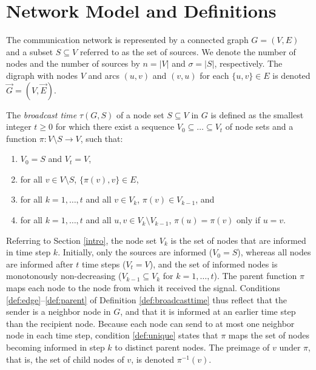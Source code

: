 \section{Network Model and Definitions} \label{sec:def}

The communication network is represented by a connected graph $G=(V,E)$ and a subset $S\subseteq V$ referred to as the set of sources.
We denote the number of nodes and the number of sources by $n=|V|$ and $\sigma=|S|$, respectively. 
The digraph with nodes $V$ and arcs $(u,v)$ and $(v,u)$ for each $\{u,v\}\in E$ is denoted $\overrightarrow{G}=(V,\overrightarrow{E})$.

\begin{definition} \label{def:broadcasttime}
The \emph{broadcast time} $\tau(G,S)$ of a node set $S\subseteq V$ in $G$ is defined as the smallest integer $t\geq 0$ for which there exist
a sequence $V_0\subseteq\dots\subseteq V_t$ of node sets and a function $\pi:V\setminus S\to V$, such that:
\begin{enumerate}
  \item $V_0=S$ and $V_t=V$, \label{def:boundary}
  \item for all $v\in V\setminus S$, $\{\pi(v),v\}\in E$, \label{def:edge}
  \item for all $k=1,\ldots,t$ and all $v\in V_k$, $\pi(v)\in V_{k-1}$, and \label{def:parent}
  \item for all $k=1,\ldots,t$ and all $u,v\in V_k\setminus V_{k-1}$, $\pi(u)=\pi(v)$ only if $u=v$. \label{def:unique}
\end{enumerate}
\end{definition}

Referring to Section \ref{intro}, the node set $V_k$ is the set of nodes that are informed in time step $k$.
Initially, only the sources are informed ($V_0=S$), whereas all nodes are informed after $t$ time steps ($V_t=V$),
and the set of informed nodes is monotonously non-decreasing ($V_{k-1}\subseteq V_k$ for $k=1,\ldots,t$).
The parent function $\pi$ maps each node to the node from which it received the signal.
Conditions \ref{def:edge}--\ref{def:parent} of Definition \ref{def:broadcasttime} thus reflect that the sender is a neighbor node in $G$,
and that it is informed at an earlier time step than the recipient node.
Because each node can send to at most one neighbor node in each time step,
condition \ref{def:unique} states that $\pi$ maps the set of nodes becoming informed in step $k$ to distinct parent nodes.
The preimage of $v$ under $\pi$, that is, the set of child nodes of $v$, is denoted $\pi^{-1}(v)$.

